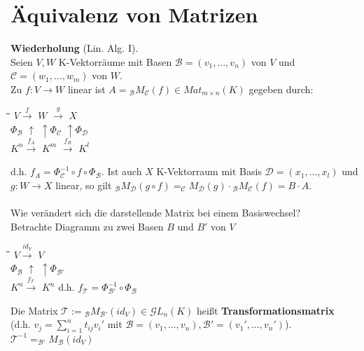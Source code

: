 \documentclass[a4paper, 12pt]{extarticle}
\begin{document}
\section{Äquivalenz von Matrizen}
\textbf{Wiederholung} (Lin. Alg. I).\\ Seien $V, W$ K-Vektorräume mit Basen $\mathcal{B} = (v_1, \dots, v_n)$ von $V$ und $\mathcal{C} = (w_1, \dots, w_m)$ von $W$. \\
Zu $f: V \longrightarrow W$ linear ist $A = {_\mathcal B}M_\mathcal{C}(f) \in Mat_{m\times n}(K)$ gegeben durch:\\
\begin{tabbing}
	\hspace{15pt}\=\hspace{40pt}\=\hspace{40pt}\= \kill
	\>$V \xrightarrow f$ \>$W$ $\xrightarrow g$ \>$X$\\
	$\Phi{_\mathcal B}$ \>$\uparrow$ \>$\uparrow \Phi_\mathcal{C}$ \>$\uparrow \Phi_\mathcal{D}$\\
	\>$K^n \xrightarrow{f_A}$ \>$K^m$ $\xrightarrow{f_B}$ \>$K^l$\\
\end{tabbing}
d.h. $f_A = \Phi_\mathcal{C}^{-1}\circ f \circ \Phi{_\mathcal B}$. Ist auch $X$ K-Vektorraum mit Basis $\mathcal{D} = (x_1, \dots, x_l)$ und $g: W \longrightarrow X$ linear, so gilt ${_\mathcal B}M_\mathcal{D}(g \circ f) = _\mathcal{C}M_\mathcal{D}(g) \cdot {_\mathcal B}M_\mathcal{C}(f) = B \cdot A$.\\ \\
Wie verändert sich die darstellende Matrix bei einem Basiswechsel?\\
Betrachte Diagramm zu zwei Basen $B$ und $B'$ von $V$\\
\begin{tabbing}
	\hspace{15pt}\=\hspace{40pt}\=\hspace{2cm}\= \kill
	\>$V \xrightarrow{id_V}$ \>$V$\\
	$\Phi{_\mathcal B}$ \>$\uparrow$ \>$\uparrow \Phi_\mathcal{B'}$\\
	\>$K^n \xrightarrow{f_\mathcal{T}}$ \>$K^n$ \>d.h. $f_\mathcal{T} = \Phi_\mathcal{B'}^{-1} \circ \Phi{_\mathcal B}$\\
\end{tabbing}
Die Matrix $\mathcal{T} := {_\mathcal B}M_\mathcal{B'}(id_V) \in \mathcal{G}L_n(K)$ heißt \textbf{Transformationsmatrix}\\
(d.h. $v_j = \sum_{i=1}^{n} t_{ij} v_i'$ mit $\mathcal{B} = (v_1, \dots, v_n), \mathcal{B'} = (v_1', \dots, v_n')$). $\mathcal{T}^{-1} = _\mathcal{B'}M{_\mathcal B}(id_V)$\\
\end{document}
